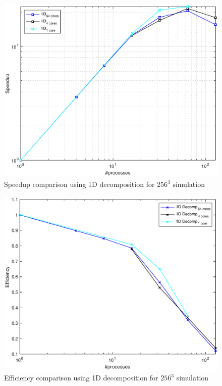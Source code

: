 \begin{figure}
\begin{center}
\includegraphics[scale=0.6]{grafici/1286}
\caption{Speedup comparison using 1D decomposition for $256^{3}$ simulation}
\label{1286}
\end{center}
\end{figure}
\begin{figure}
\begin{center}
\includegraphics[scale=0.6]{grafici/1288}
\caption{Efficiency comparison using 1D decomposition for $256^{3}$ simulation}
\label{1288}
\end{center}
\end{figure}
